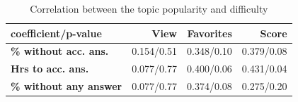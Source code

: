 \begin{table}[t]
  \centering
  \caption{Correlation between the topic popularity and difficulty}
    \begin{tabular}{lrrr}\toprule
    coefficient/p-value & \bf{View} & \bf{Favorites} & \bf{Score}\\ \midrule
    \bf{\% without acc. ans.} &   0.154/0.51    & 0.348/0.10      &  0.379/0.08 \\
    \bf{Hrs to acc. ans.} &    0.077/0.77   &   0.400/0.06     & 0.431/0.04  \\
    \bf{\% without any answer} &   0.077/0.77    & 0.374/0.08      &  0.275/0.20 \\
    \bottomrule
    \end{tabular}%
  \label{tab:correlation}%
\end{table}



